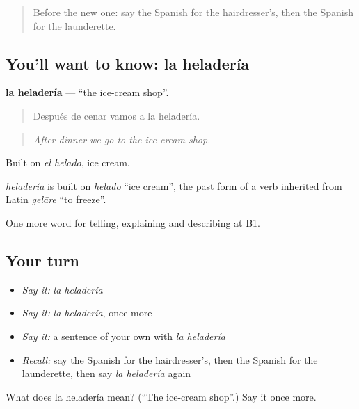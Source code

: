 \label{lesson:ES-C680-heladeria}



\begin{quote}
Before the new one: say the Spanish for the hairdresser’s, then the Spanish for the launderette.
\end{quote}

\subsection*{You'll want to know: la heladería}
\textbf{la heladería} — \textquotedblleft{}the ice-cream shop\textquotedblright{}.

\begin{quote}
Después de cenar vamos a la heladería.
\end{quote}

\begin{quote}
\emph{After dinner we go to the ice-cream shop.}
\end{quote}

Built on \emph{el helado}, ice cream.

\begin{cousinweb}
\emph{heladería} is built on \emph{helado} \textquotedblleft{}ice cream\textquotedblright{}, the past form of a verb inherited from Latin \emph{gelāre} \textquotedblleft{}to freeze\textquotedblright{}.
\end{cousinweb}

\begin{grammarlens}[title={What you've built}]
One more word for telling, explaining and describing at B1.
\end{grammarlens}

\subsection*{Your turn}
\begin{itemize}
\raggedright
  \item \emph{Say it:} \emph{la heladería}
  \item \emph{Say it:} \emph{la heladería}, once more
  \item \emph{Say it:} a sentence of your own with \emph{la heladería}
  \item \emph{Recall:} say the Spanish for the hairdresser’s, then the Spanish for the launderette, then say \emph{la heladería} again
\end{itemize}

\begin{tcolorbox}[breakable,colback=teal!4,colframe=teal!35!black,title={Before you move on}]
What does la heladería mean? (\textquotedblleft{}The ice-cream shop\textquotedblright{}.) Say it once more.
\end{tcolorbox}
